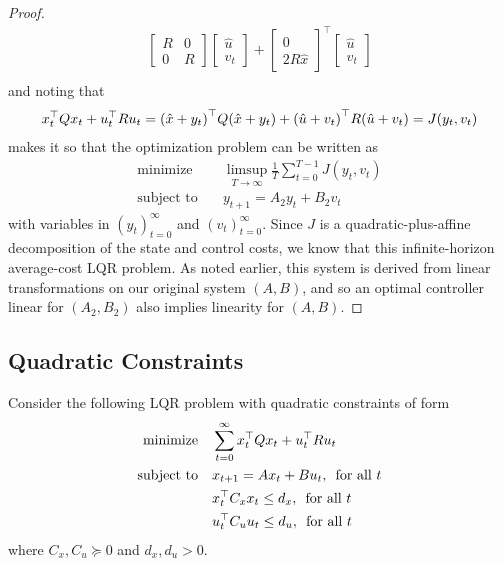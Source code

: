 \documentclass[12pt]{article}
\begin{document}
\begin{proof}
\begin{align*}
          \begin{bmatrix} R & 0 \\ 0 & R \end{bmatrix}
          \begin{bmatrix} \hat{u} \\ v_t \end{bmatrix}
        + \begin{bmatrix} 0 \\ 2 R \hat{x} \end{bmatrix}^\top
          \begin{bmatrix} \hat{u} \\ v_t \end{bmatrix} \\
  \end{align*}
  and noting that
  \begin{align*}
    x_t ^\top Q x_t + u_t ^\top R u_t
      = {\left(\hat{x} + y_t\right)}^\top Q {\left(\hat{x} + y_t\right)}
        + {\left(\hat{u} + v_t\right)}^\top R {\left(\hat{u} + v_t\right)}
      = J(y_t, v_t)
  \end{align*}
  makes it so that the optimization problem can be written as
  \begin{align*}
    \text{minimize}
      &\quad
        \limsup_{T \to \infty} \frac{1}{T} \sum_{t = 0}^{T - 1}
          J(y_t, v_t) \\
    \text{subject to}
      &\quad y_{t + 1} = A_2 y_t + B_2 v_t
  \end{align*}
  with variables in \((y_t)_{t = 0}^{\infty}\) and \((v_t)_{t = 0}^{\infty}\).
  Since \(J\) is a quadratic-plus-affine decomposition of the
  state and control costs,
  we know that this infinite-horizon average-cost LQR problem.
  As noted earlier,
  this system is derived from linear transformations on our original
  system \((A, B)\), and so an optimal controller linear for \((A_2, B_2)\)
  also implies linearity for \((A, B)\).

\end{proof}


\subsection{Quadratic Constraints}
Consider the following LQR problem with quadratic constraints of form
\begin{align}
  \text{minimize} &\quad \sum_{t = 0}^{\infty}
    x_t ^\top Q x_t + u_t ^\top R u_t
    \label{eqn:quad-lqr} \\
  \text{subject to}
    &\quad x_{t + 1} = A x_t + B u_t, \enskip \text{for all \(t\)} \nonumber \\
    &\quad x_t ^\top C_x x_t \leq d_x, \enskip \text{for all \(t\)} \nonumber \\
    &\quad u_t ^\top C_u u_t \leq d_u, \enskip \text{for all \(t\)} \nonumber
\end{align}
where \(C_x, C_u \succeq 0\) and \(d_x, d_u > 0\).
\end{document}
